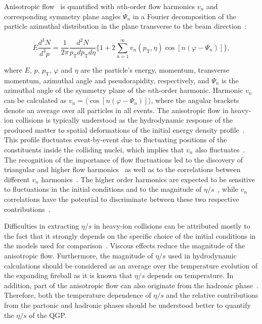 Anisotropic flow~\cite{Ollitrault:1992bk} is quantified with $n{\mathrm{th}}$-order flow harmonics $v_n$ and corresponding symmetry plane angles $\Psi_n$ in a Fourier decomposition of the particle azimuthal distribution in the plane transverse to the beam direction~\cite{Voloshin:1994mz,Poskanzer:1998yz}:

\begin{equation}
E\frac{{d}^3N}{{d^3}{p}} = \frac{1}{2\pi}\frac{{d}^2N}{p_{\mathrm{T}}{d}p_{\mathrm{T}}{d}\eta} \Big\{1 + 2\sum_{n=1}^{\infty} v_n(p_{\mathrm{T}},\eta) \cos[n(\varphi - \Psi_n)]\Big\},
\label{Eq:Fourier}
\end{equation}

\noindent where $E$, $p$, $p_{\mathrm{T}}$, $\varphi$ and $\eta$ are the particle's energy, momentum, transverse momentum, azimuthal angle and pseudorapidity, respectively, and $\Psi_n$ is the azimuthal angle of the symmetry plane of the $n{\mathrm{th}}$-order harmonic. Harmonic $v_n$ can be calculated as $v_{n} = \langle{\cos[n(\varphi - \Psi_n)]}\rangle$, where the angular brackets denote an average over all particles in all events.
The anisotropic flow in heavy-ion collisions is typically understood as the hydrodynamic response of the produced matter to spatial deformations of the initial energy density profile~\cite{Floerchinger:2013tya}.
This profile fluctuates event-by-event due to fluctuating positions of the constituents inside the colliding nuclei, which implies that $v_n$ also fluctuates~\cite{Miller:2003kd,Alver:2006wh}.
The recognition of the importance of flow fluctuations led to the discovery of triangular and higher flow harmonics~\cite{Alver:2010gr,ALICE:2011ab} as well as to the correlations between different $v_{n}$ harmonics~\cite{Niemi:2012aj,Aad:2014fla}.
The higher order harmonics are expected to be sensitive to fluctuations in the initial conditions and to the magnitude of $\eta/s$~\cite{Alver:2010dn,Luzum:2012wu}, while $v_{n}$ correlations have the potential to discriminate between these two respective contributions~\cite{Niemi:2012aj}.

Difficulties in extracting $\eta/s$ in heavy-ion collisions can be attributed mostly to the fact that it strongly depends on the specific choice of the initial conditions in the models used for comparison~\cite{Romatschke:2007mq,Luzum:2012wu,Shen:2011zc}.
Viscous effects reduce the magnitude of the anisotropic flow. Furthermore, the magnitude of $\eta/s$ used in hydrodynamic calculations should be considered as an average over the temperature evolution of the expanding fireball as it is known that $\eta/s$ depends on temperature. 
In addition, part of the anisotropic flow can also originate from the hadronic phase~\cite{Bozek:2011ua,Rose:2014fba,Ryu:2015vwa}. Therefore,
both the temperature dependence of $\eta/s$ and the relative contributions from the partonic and hadronic phases should be understood better to quantify the $\eta/s$ of the QGP.

